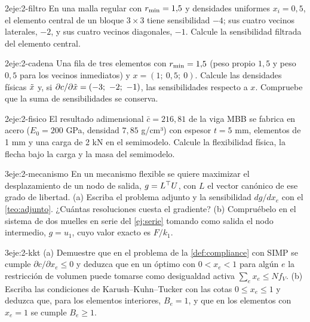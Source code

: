 \begin{ejercicio}{2}{eje:2-filtro}
En una malla regular con $r_{\min}=1{,}5$ y densidades uniformes $x_i=0{,}5$, el elemento central de un bloque $3\times 3$ tiene sensibilidad $-4$; sus cuatro vecinos laterales, $-2$, y sus cuatro vecinos diagonales, $-1$. Calcule la sensibilidad filtrada del elemento central.
\end{ejercicio}

\begin{ejercicio}{2}{eje:2-cadena}
Una fila de tres elementos con $r_{\min}=1{,}5$ (peso propio $1{,}5$ y peso $0{,}5$ para los vecinos inmediatos) y $x=(1;\ 0{,}5;\ 0)$. Calcule las densidades físicas $\tilde{x}$ y, si $\partial c/\partial\xf=(-3;\ -2;\ -1)$, las sensibilidades respecto a $x$. Compruebe que la suma de sensibilidades se conserva.
\end{ejercicio}

\begin{ejercicio}{2}{eje:2-fisico}
El resultado adimensional $\bar c=216{,}81$ de la viga MBB se fabrica en acero ($E_0=200$ GPa, densidad $7{,}85$ g/cm³) con espesor $t=5$ mm, elementos de 1 mm y una carga de 2 kN en el semimodelo. Calcule la flexibilidad física, la flecha bajo la carga y la masa del semimodelo.
\end{ejercicio}

\begin{ejercicio}{3}{eje:2-mecanismo}
En un mecanismo flexible se quiere maximizar el desplazamiento de un nodo de salida, $g=L^\top U$, con $L$ el vector canónico de ese grado de libertad. (a) Escriba el problema adjunto y la sensibilidad $dg/dx_e$ con el \cref{teo:adjunto}. ¿Cuántas resoluciones cuesta el gradiente? (b) Compruébelo en el sistema de dos muelles en serie del \cref{ej:serie} tomando como salida el nodo intermedio, $g=u_1$, cuyo valor exacto es $F/k_1$.
\end{ejercicio}

\begin{ejercicio}{3}{eje:2-kkt}
(a) Demuestre que en el problema de la \cref{def:compliance} con SIMP se cumple $\partial c/\partial x_e\le 0$ y deduzca que en un óptimo con $0<x_e<1$ para algún $e$ la restricción de volumen puede tomarse como desigualdad activa $\sum_ex_e\le Nf_V$. (b) Escriba las condiciones de Karush--Kuhn--Tucker con las cotas $0\le x_e\le 1$ y deduzca que, para los elementos interiores, $B_e=1$, y que en los elementos con $x_e=1$ se cumple $B_e\ge 1$.
\end{ejercicio}
